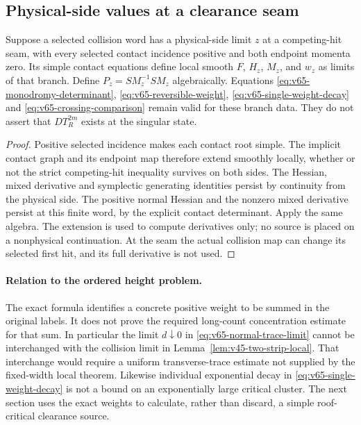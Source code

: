\subsection{Physical-side values at a clearance seam}
\begin{proposition}
\label{prop:v65-boundary-monodromy}
Suppose a selected collision word has a physical-side limit $z$ at
a competing-hit seam, with every selected contact incidence positive
and both endpoint momenta zero. Its simple contact equations define
local smooth $F$, $H_z$, $M_z$, and $w_z$ as limits of that branch.
Define $P_z=S M_z^{-1}S M_z$ algebraically. Equations
\eqref{eq:v65-monodromy-determinant},
\eqref{eq:v65-reversible-weight},
\eqref{eq:v65-single-weight-decay} and
\eqref{eq:v65-crossing-comparison} remain valid for these branch data.
They do not assert that $D T_R^{2m}$ exists at the singular state.
\end{proposition}
\begin{proof}
Positive selected incidence makes each contact root simple. The
implicit contact graph and its endpoint map therefore extend smoothly
locally, whether or not the strict competing-hit inequality survives
on both sides. The Hessian, mixed derivative and symplectic generating
identities persist by continuity from the physical side. The positive
normal Hessian and the nonzero mixed derivative persist at this finite
word, by the explicit contact determinant. Apply the same algebra.
The extension is used to compute derivatives only; no source is placed
on a nonphysical continuation. At the seam the actual collision map
can change its selected first hit, and its full derivative is not used.
\end{proof}

\paragraph{Relation to the ordered height problem.}
The exact formula identifies a concrete positive weight to be summed
in the original labels. It does not prove the required long-count
concentration estimate for that sum. In particular the limit
$d\downarrow0$ in \eqref{eq:v65-normal-trace-limit} cannot be
interchanged with the collision limit in
Lemma~\ref{lem:v45-two-strip-local}. That interchange would require
a uniform transverse-trace estimate not supplied by the fixed-width
local theorem. Likewise individual exponential decay in
\eqref{eq:v65-single-weight-decay} is not a bound on an exponentially
large critical cluster. The next section uses the exact weights to
calculate, rather than discard, a simple roof-critical clearance source.
